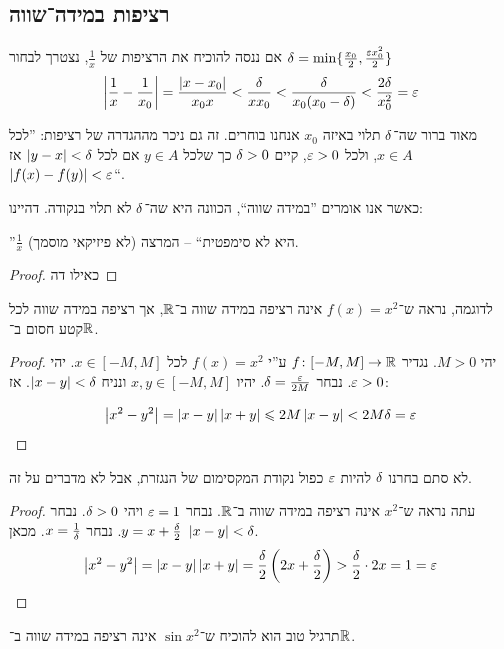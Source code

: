 \documentclass[name=רשימות חשבון דיפרנציאלי ואינטגרלי 1א]{../../../tex/classes/megasumPreamble}
\begin{document}
	\subsection{רציפות במידה־שווה}


	אם ננסה להוכיח את הרציפות של $\frac{1}{x}$, נצטרך לבחור $\dg = \min\{\frac{x_0}{2}, \frac{\eg x_0^{2}}{2}\}$
	\[ \sof{\frac{1}{x} - \frac{1}{x_0}} = \frac{\sof{x - x_0}}{x_0x} < \frac{\dg}{xx_0} < \frac{\dg}{x_0(x_0 - \dg)} < \frac{2\dg}{x_0^{2}} = \eg \]

	מאוד ברור שה־$\delta$ תלוי באיזה $x_0$ אנחנו בוחרים. זה גם ניכר מההגדרה של רציפות: ''לכל $x \in A$, ולכל $\eg > 0$, קיים $\delta > 0$ כך שלכל $y \in A$ אם לכל $\left \lvert y - x \right \rvert < \delta$ אז $\sof{f(x) - f(y)} < \eg$``.

	כאשר אנו אומרים ''במידה שווה``, הכוונה היא שה־$\delta$ לא תלוי בנקודה. דהיינו:

	''$\frac{1}{x}$ היא לא סימפטית`` – המרצה (לא פיזיקאי מוסמך).

	\begin{proof}
		כאילו דה
	\end{proof}

	לדוגמה, נראה ש־$f(x) = x^{2}$ אינה רציפה במידה שווה ב־$\mathbb{R}$, אך רציפה במידה שווה לכל קטע חסום ב־$\mathbb{R}$.
	\begin{proof}
		יהי $M > 0$. נגדיר $f \colon [-M, M] \to \mathbb{R}$ ע''י $f(x) = x^{2}$ לכל $x \in [-M, M]$. יהי $\eg > 0$. נבחר $\dg = \frac{\eg}{2M}$. יהיו $x, y \in [-M, M]$ ונניח $\left \lvert x - y \right \rvert < \delta$. אז:

		\[ \sof{x^{2} - y^{2}} = \sof{x - y}\sof{x + y} \le 2M\sof{x - y} < 2M\dg = \eg \]
	\end{proof}
	לא סתם בחרנו $\delta$ להיות $\eg$ כפול נקודת המקסימום של הנגזרת, אבל לא מדברים על זה.
	\begin{proof}
		עתה נראה ש־$x^{2}$ אינה רציפה במידה שווה ב־$\mathbb{R}$. נבחר $\eg = 1$ ויהי $\delta > 0$. נבחר $y = x + \frac{\delta}{2}$. נבחר $x = \frac{1}{\delta}$. מכאן $\left \lvert x - y \right \rvert < \delta$.
		\[ \sof{x^{2} - y^{2}} = \sof{x - y}\sof{x + y} = \frac{\dg}{2}\cl{2x + \frac{\dg}{2}} > \frac{\dg}{2} \cdot 2x = 1 = \eg \]
	\end{proof}
	תרגיל טוב הוא להוכיח ש־$\sin x^{2}$ אינה רציפה במידה שווה ב־$\mathbb{R}$.
\end{document}
